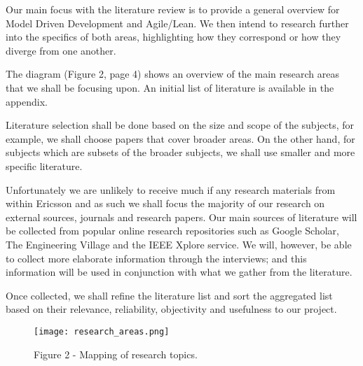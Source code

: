 \documentclass[ProjectPlan_innit.tex]{subfiles}
\begin{document}
Our main focus with the literature review is to provide a general overview for Model Driven Development and Agile/Lean. We then intend to research further into the specifics of both areas, highlighting how they correspond or how they diverge from one another. 
\smallskip

The diagram (Figure 2, page 4) shows an overview of the main research areas that we shall be focusing upon. An initial list of literature is available in the appendix.
\smallskip

Literature selection shall be done based on the size and scope of the subjects, for example, we shall choose papers that cover broader areas. On the other hand, for subjects which are subsets of the broader subjects, we shall use smaller and more specific literature.
\smallskip

Unfortunately we are unlikely to receive much if any research materials from within Ericsson and as such we shall focus the majority of our research on external sources, journals and research papers. Our main sources of literature will be collected from popular online research repositories such as Google Scholar, The Engineering Village and the IEEE Xplore service. We will, however, be able to collect more elaborate information through the interviews; and this information will be used in conjunction with what we gather from the literature. 
\smallskip

Once collected, we shall refine the literature list and sort the aggregated list based on their relevance, reliability, objectivity and usefulness to our project. 
\smallskip

\begin{figure*}[H!]
  \texttt{[image: research\_areas.png]}
  \caption{Figure 2 - Mapping of research topics.}
  \label{BBB}
\end{figure*}
\end{document}
